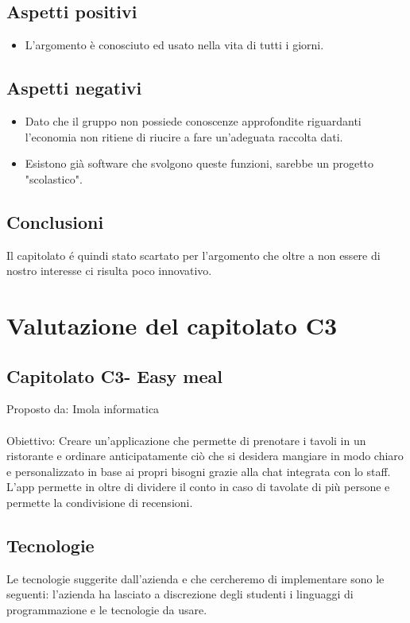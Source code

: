 \documentclass{article}
\begin{document}
\subsection{Aspetti positivi}
\begin{itemize}
    \item L'argomento è conosciuto ed usato nella vita di tutti i giorni.
\end{itemize}
\subsection{Aspetti negativi}
\begin{itemize}
    \item  Dato che il gruppo non possiede conoscenze approfondite riguardanti l'economia non ritiene di riucire a fare un'adeguata raccolta dati.
    \item Esistono già software che svolgono queste funzioni, sarebbe un progetto "scolastico".
 
\end{itemize}
\subsection{Conclusioni}
Il capitolato é quindi stato scartato per l'argomento che oltre a non essere di nostro interesse ci risulta poco innovativo.
\section{Valutazione del capitolato C3}
\subsection{Capitolato C3- Easy meal}
Proposto da: Imola informatica\\ \\
Obiettivo: Creare un'applicazione che permette di prenotare i tavoli in un ristorante e ordinare anticipatamente ciò che si desidera mangiare in modo chiaro e personalizzato in base ai propri bisogni grazie alla chat integrata con lo staff. L'app permette in oltre di dividere il conto in caso di tavolate di più persone e permette la condivisione di recensioni.
\subsection{Tecnologie}
Le tecnologie suggerite dall’azienda e che cercheremo di implementare sono le seguenti:
l'azienda ha lasciato a discrezione degli studenti i linguaggi di programmazione e le tecnologie da usare.
\end{document}
